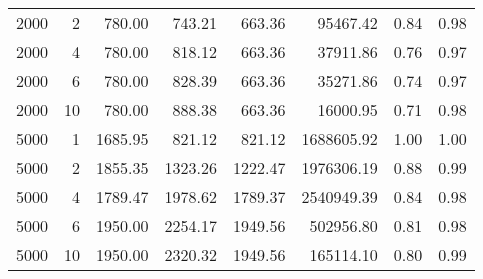 \begin{table}[ht]
\begin{tabular}{rrrrrrrr}
  2000 &   2 & 780.00 & 743.21 & 663.36 & 95467.42 & 0.84 & 0.98 \\ 
  2000 &   4 & 780.00 & 818.12 & 663.36 & 37911.86 & 0.76 & 0.97 \\ 
  2000 &   6 & 780.00 & 828.39 & 663.36 & 35271.86 & 0.74 & 0.97 \\ 
  2000 &  10 & 780.00 & 888.38 & 663.36 & 16000.95 & 0.71 & 0.98 \\ 
  5000 &   1 & 1685.95 & 821.12 & 821.12 & 1688605.92 & 1.00 & 1.00 \\ 
  5000 &   2 & 1855.35 & 1323.26 & 1222.47 & 1976306.19 & 0.88 & 0.99 \\ 
  5000 &   4 & 1789.47 & 1978.62 & 1789.37 & 2540949.39 & 0.84 & 0.98 \\ 
  5000 &   6 & 1950.00 & 2254.17 & 1949.56 & 502956.80 & 0.81 & 0.98 \\ 
  5000 &  10 & 1950.00 & 2320.32 & 1949.56 & 165114.10 & 0.80 & 0.99 \\ 
   \hline
\end{tabular}
\end{table}
